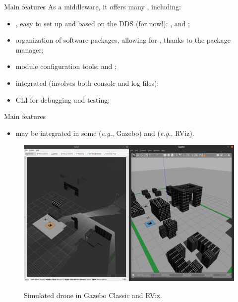 \begin{frame}{Main features}
	As a middleware, it offers many , including:
	\begin{itemize}
		\item {}, easy to set up and based on the DDS (for now!): ,  and ;
		\item organization of software packages, allowing for , thanks to the  package manager;
		\item module configuration tools:  and ;
		\item integrated  (involves both console and log files);
		\item CLI  for debugging and testing;
	\end{itemize}
\end{frame}
\begin{frame}{Main features}
	\begin{itemize}
		\item may be integrated in some  (\emph{e.g.}, Gazebo) and  (\emph{e.g.}, RViz).
	\end{itemize}
	\begin{figure}
		\centering
		\includegraphics[scale=.133]{simulation.png}
		\label{fig:sim}
		\caption{Simulated drone in Gazebo Classic and RViz.}
	\end{figure}
\end{frame}


